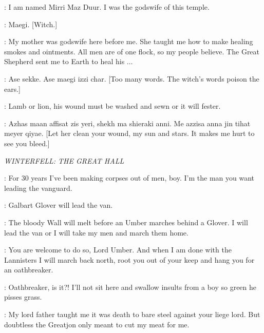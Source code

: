 \MIRRI: I am named Mirri Maz Duur. I was the godswife of this temple.  

\RAKHARO: Maegi. [Witch.] 

\MIRRI: My mother was godswife here before me. She taught me how to make healing smokes and ointments. All men are of one flock, so my people believe. The Great Shepherd sent me to Earth to heal his $\ldots$ 


\RAKHARO: Ase sekke. Ase maegi izzi char. [Too many words. The witch's words poison the ears.] 

\MIRRI: Lamb or lion, his wound must be washed and sewn or it will fester. 

\DAENERYS: Azhas maan affisat zis yeri, shekh ma shieraki anni. Me azzisa anna jin tihat meyer qiyae. [Let her clean your wound, my sun and stars. It makes me hurt to see you bleed.] 



\scene

\textit{WINTERFELL: THE GREAT HALL}


\UMBER: For 30 years I've been making corpses out of men, boy. I'm the man you want leading the vanguard. 

\ROBB: Galbart Glover will lead the van. 

\UMBER: The bloody Wall will melt before an Umber marches behind a Glover. I will lead the van or I will take my men and march them home. 

\ROBB: You are welcome to do so, Lord Umber.  And when I am done with the Lannisters I will march back north, root you out of your keep and hang you for an oathbreaker. 

\UMBER: Oathbreaker, is it?!  I'll not sit here and swallow insults from a boy so green he pisses grass. 


\ROBB: My lord father taught me it was death to bare steel against your liege lord. But doubtless the Greatjon only meant to cut my meat for me. 

